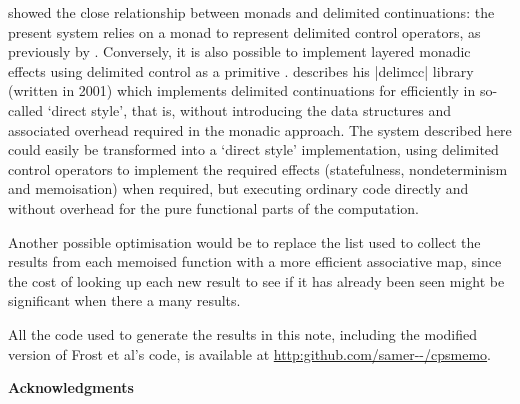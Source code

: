 \citet{Filinski1994} showed the close relationship between monads and delimited 
continuations: the present system relies on a monad to represent
delimited control operators, as previously by \citet{DyvbigJonesSabry2005}. 
Conversely, it is also possible to implement layered monadic effects using delimited control
as a primitive \cite{Filinski1999}. \citet{Kiselyov2012} describes his |delimcc| library
(written in 2001) which implements delimited continuations for \OCaml efficiently
in so-called `direct style', that is, without introducing the data structures
and associated overhead required in the monadic approach. The system described
here could easily be transformed into a `direct style' implementation, using
delimited control operators to implement the required effects (statefulness,
nondeterminism and memoisation) when required, but executing ordinary \OCaml
code directly and without overhead for the pure functional parts of the computation.

Another possible optimisation would be to replace the list used to collect the
results from each memoised function with a more efficient associative
map, since the cost of looking up 
each new result to see if it has already been seen might be significant when
there a many results.

All the code used to generate the results in this note, including the modified
version of Frost et al's code, is available at \url{http:github.com/samer--/cpsmemo}.

\bigskip
\noindent
\textbf{Acknowledgments}\\
\TheAcknowledgments

\appendix

